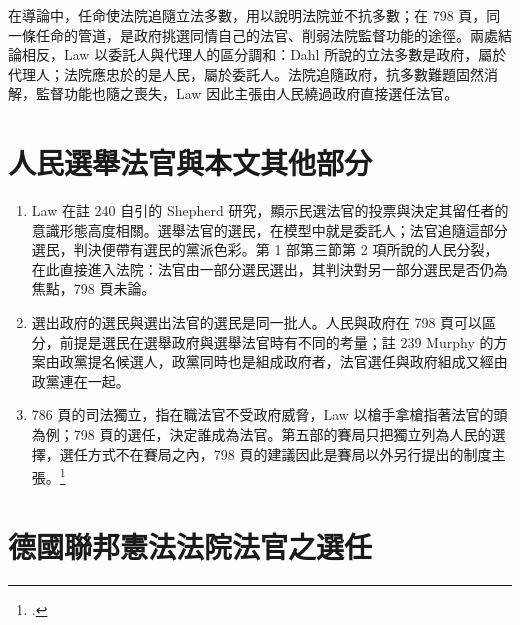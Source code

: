 在導論中，任命使法院追隨立法多數，用以說明法院並不抗多數；在 798 頁，同一條任命的管道，是政府挑選同情自己的法官、削弱法院監督功能的途徑。兩處結論相反，Law 以委託人與代理人的區分調和：Dahl 所說的立法多數是政府，屬於代理人；法院應忠於的是人民，屬於委託人。法院追隨政府，抗多數難題固然消解，監督功能也隨之喪失，Law 因此主張由人民繞過政府直接選任法官。

\section{人民選舉法官與本文其他部分}
\label{sec:40_selection-4}

\begin{enumerate}
\tightlist
\item
  Law 在註 240 自引的 Shepherd 研究，顯示民選法官的投票與決定其留任者的意識形態高度相關。選舉法官的選民，在模型中就是委託人；法官追隨這部分選民，判決便帶有選民的黨派色彩。第 1 部第三節第 2 項所說的人民分裂，在此直接進入法院：法官由一部分選民選出，其判決對另一部分選民是否仍為焦點，798 頁未論。
\item
  選出政府的選民與選出法官的選民是同一批人。人民與政府在 798 頁可以區分，前提是選民在選舉政府與選舉法官時有不同的考量；註 239 Murphy 的方案由政黨提名候選人，政黨同時也是組成政府者，法官選任與政府組成又經由政黨連在一起。
\item
  786 頁的司法獨立，指在職法官不受政府威脅，Law 以槍手拿槍指著法官的頭為例；798 頁的選任，決定誰成為法官。第五部的賽局只把獨立列為人民的選擇，選任方式不在賽局之內，798 頁的建議因此是賽局以外另行提出的制度主張。\footcite[786--787]{law2009}
\end{enumerate}

\section{德國聯邦憲法法院法官之選任}
\label{sec:40_selection-de}


